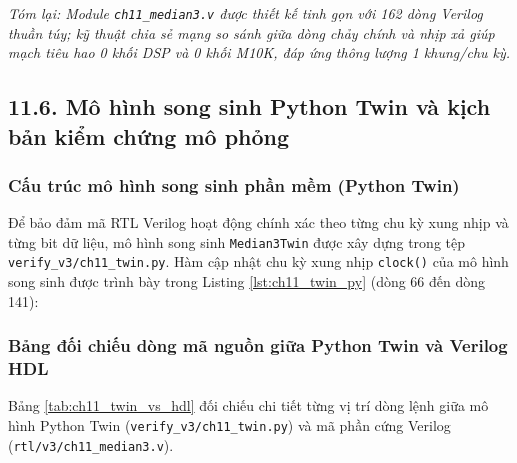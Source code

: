 \textit{Tóm lại: Module \texttt{ch11\_median3.v} được thiết kế tinh gọn với 162 dòng Verilog thuần túy; kỹ thuật chia sẻ mạng so sánh giữa dòng chảy chính và nhịp xả giúp mạch tiêu hao 0 khối DSP và 0 khối M10K, đáp ứng thông lượng 1 khung/chu kỳ.}

\subsection*{11.6. Mô hình song sinh Python Twin và kịch bản kiểm chứng mô phỏng}

\subsubsection*{Cấu trúc mô hình song sinh phần mềm (Python Twin)}
Để bảo đảm mã RTL Verilog hoạt động chính xác theo từng chu kỳ xung nhịp và từng bit dữ liệu, mô hình song sinh \texttt{Median3Twin} được xây dựng trong tệp \texttt{verify\_v3/ch11\_twin.py}.
Hàm cập nhật chu kỳ xung nhịp \texttt{clock()} của mô hình song sinh được trình bày trong Listing \ref{lst:ch11_twin_py} (dòng 66 đến dòng 141):



\subsubsection*{Bảng đối chiếu dòng mã nguồn giữa Python Twin và Verilog HDL}
Bảng \ref{tab:ch11_twin_vs_hdl} đối chiếu chi tiết từng vị trí dòng lệnh giữa mô hình Python Twin (\texttt{verify\_v3/ch11\_twin.py}) và mã phần cứng Verilog (\texttt{rtl/v3/ch11\_median3.v}).

